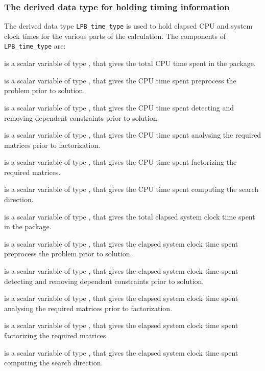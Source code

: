 \documentclass{galahad}
\newcommand{\packagename}{LPB}
\begin{document}
\subsubsection{The derived data type for holding timing
 information}\label{typetime}
The derived data type
{\tt \packagename\_time\_type}
is used to hold elapsed CPU and system clock times for the various parts of
the calculation. The components of
{\tt \packagename\_time\_type}
are:
\begin{description}
 is a scalar variable of type \realdp, that gives
 the total CPU time spent in the package.

 is a scalar variable of type \realdp, that gives
 the CPU time spent preprocess the problem prior to solution.

 is a scalar variable of type \realdp, that gives
 the CPU time spent detecting and removing dependent constraints prior
to solution.

 is a scalar variable of type \realdp, that gives
 the CPU time spent analysing the required matrices prior to factorization.

 is a scalar variable of type \realdp, that gives
 the CPU time spent factorizing the required matrices.

 is a scalar variable of type \realdp, that gives
 the CPU time spent computing the search direction.

 is a scalar variable of type \realdp, that gives
 the total elapsed system clock time spent in the package.

 is a scalar variable of type \realdp, that gives
 the elapsed system clock time spent preprocess the problem prior to solution.

 is a scalar variable of type \realdp,
that gives  the elapsed system clock time spent detecting and removing
dependent constraints prior to solution.

 is a scalar variable of type \realdp, that gives
 the elapsed system clock time spent analysing the required matrices prior to
factorization.

 is a scalar variable of type \realdp, that gives
 the elapsed system clock time spent factorizing the required matrices.

 is a scalar variable of type \realdp, that gives
 the elapsed system clock time spent computing the search direction.

\end{description}
\end{document}
